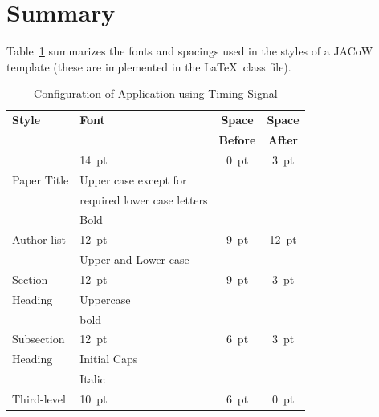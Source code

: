 \documentclass[a4paper,
              ]{jacow}
\begin{document}
\clearpage
\section{Summary}

Table~\ref{app-conf} summarizes the fonts and spacings used in the styles of
a JACoW template (these are implemented in the \LaTeX\ class file).
\begin{table}[h!t]
    \setlength\tabcolsep{3.8pt}
    \caption{Configuration of Application using Timing Signal}
    \label{app-conf}
    \begin{tabular}{@{}llcc@{}}
        \toprule
        \textbf{Style} & \textbf{Font}               & \textbf{Space}  & \textbf{Space} \\
                       &                             & \textbf{Before} & \textbf{After} \\
        \midrule
                       & \SI{14}{pt}                 & \SI{0}{pt}      & \SI{3}{pt}  \\
          Paper Title  & Upper case except for       &                 &      \\
                       & required lower case letters &                 &      \\   %
                       & Bold                        &                 &      \\
         \midrule
          Author list  & \SI{12}{pt}                 & \SI{9}{pt}      & \SI{12}{pt} \\
                       & Upper and Lower case        &                 &      \\
         \midrule
         Section       & \SI{12}{pt}                 & \SI{9}{pt}      & \SI{3}{pt}  \\
         Heading       & Uppercase                   &                 &      \\
                       & bold                        &                 &      \\
        \midrule
         Subsection    & \SI{12}{pt}                 & \SI{6}{pt}      & \SI{3}{pt}  \\
         Heading       & Initial Caps                &                 &      \\
                       & Italic                      &                 &      \\
        \midrule
         Third-level   & \SI{10}{pt}                 & \SI{6}{pt}           & \SI{0}{pt}  \\

\end{tabular}
\end{table}
\end{document}
